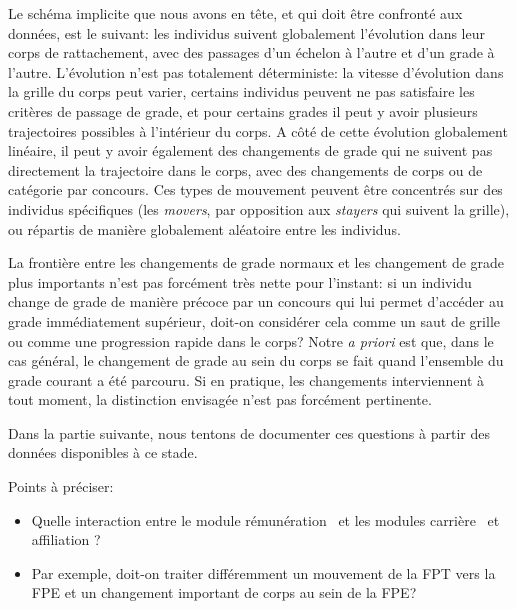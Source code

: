 \documentclass[11pt,a4paper]{article}
\begin{document}
Le schéma implicite que nous avons en tête, et qui doit être confronté aux données, est le suivant: les individus suivent globalement l'évolution dans leur corps de rattachement, avec des passages d'un échelon à l'autre et d'un grade à l'autre. L'évolution n'est pas totalement déterministe: la vitesse d'évolution dans la grille du corps peut varier, certains individus peuvent ne pas satisfaire les critères de passage de grade, et pour certains grades il peut y avoir plusieurs trajectoires possibles à l'intérieur du corps. A côté de cette évolution globalement linéaire, il peut y avoir également des changements de grade qui ne suivent pas directement la trajectoire dans le corps, avec des changements de corps ou de catégorie par concours. Ces types de mouvement peuvent être concentrés sur des individus spécifiques (les \textit{movers}, par opposition aux \textit{stayers} qui suivent la grille), ou répartis de manière globalement aléatoire entre les individus. 

La frontière entre les changements de grade \og normaux \fg{}  et les changement de grade plus importants n'est pas forcément très nette pour l'instant: si un individu change de grade de manière précoce par un concours qui lui permet d'accéder au grade immédiatement supérieur, doit-on considérer cela comme un saut de grille ou comme une progression rapide dans le corps? Notre \textit{a priori} est que, dans le cas général, le changement de grade au sein du corps se fait quand l'ensemble du grade courant a été parcouru. Si en pratique, les changements interviennent à tout moment, la distinction envisagée n'est pas forcément pertinente.  


Dans la partie suivante, nous tentons de documenter ces questions à partir des données disponibles à ce stade. 


\vspace{0.5cm}
Points à préciser: 
\begin{itemize}[leftmargin=1cm ,parsep=0cm,itemsep=0cm,topsep=0cm] 
\item Quelle interaction entre le module \og rémunération \fg\ et les modules \og carrière \fg\ et \og affiliation \fg ?   
\item[] Par exemple, doit-on traiter différemment un mouvement de la FPT vers la FPE et un changement important de corps au sein de la FPE? 
\end{itemize}



\ifx\isEmbedded\undefined
\newpage
 

\end{document}
